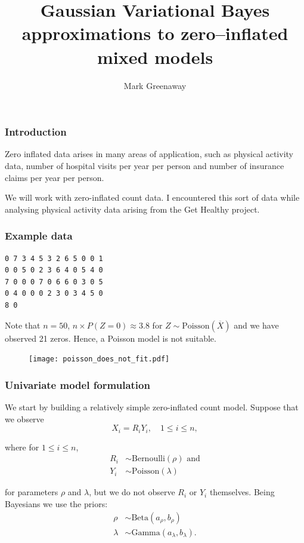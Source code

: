 \documentclass{beamer}
\title{Gaussian Variational Bayes approximations to zero--inflated mixed models}
\author{Mark Greenaway}
\begin{document}
\begin{frame}
	\titlepage
\end{frame}

\begin{frame}
	\frametitle{Introduction}
	Zero inflated data arises in many areas of application, such as physical
	activity data, number of hospital visits per year per person and
	number of insurance claims per year per person.
	
	\bigskip 
	We will work with zero-inflated count data. I encountered this sort of data 
	while analysing physical activity data arising from the Get Healthy project.
\end{frame}

\begin{frame}[fragile]
	\frametitle{Example data}
	\begin{verbatim}
0 7 3 4 5 3 2 6 5 0 0 1
0 0 5 0 2 3 6 4 0 5 4 0
7 0 0 0 7 0 6 6 0 3 0 5
0 4 0 0 0 2 3 0 3 4 5 0
8 0
	\end{verbatim}
	
	\noindent Note that $n=50$, 
	$n\times P(Z = 0) \approx 3.8$ for $Z\sim\mbox{Poisson}(\overline{X})$
	and we have observed 21 zeros. Hence,
	a Poisson model is not suitable.
	
	\begin{figure}
		\texttt{[image: poisson\_does\_not\_fit.pdf]}
	\end{figure}%
\end{frame}

\begin{frame}
	\frametitle{Univariate model formulation}
	
	We start by building a relatively simple zero-inflated count model. Suppose that we observe
	$$
	X_i = R_i Y_i, \quad 1\le i\le n,
	$$
	
	\noindent where for $1\le i\le n$,
	\begin{align*} 
		R_i & \sim \text{Bernoulli}(\rho) \text{ and} \\
		Y_i & \sim \text{Poisson}(\lambda)            
	\end{align*}
	
	\noindent for parameters $\rho$ and $\lambda$,
	but we do not observe $R_i$ or $Y_i$ themselves.
	Being Bayesians we use the priors:
	\begin{align*} 
		\rho    & \sim \text{Beta}(a_\rho, b_\rho)         \\
		\lambda & \sim \text{Gamma}(a_\lambda, b_\lambda). 
	\end{align*}
	
\end{frame}
\end{document}
